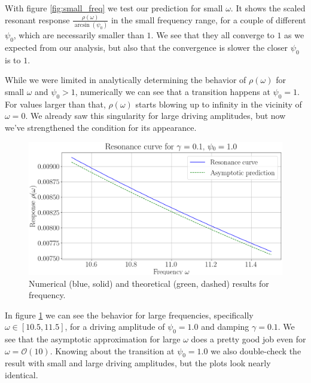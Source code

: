 \documentclass[10pt,a4paper,twocolumn]{article}
\begin{document}
With figure \ref{fig:small_freq} we test our prediction for small $\omega$. It shows the scaled resonant response $\frac{\rho(\omega)}{\arcsin(\psi_0)}$ in the small frequency range, for a couple of different $\psi_0$, which are necessarily smaller than $1$. We see that they all converge to $1$ as we expected from our analysis, but also that the convergence is slower the closer $\psi_0$ is to $1$.

While we were limited in analytically determining the behavior of $\rho(\omega)$ for small $\omega$ and $\psi_0 > 1$, numerically we can see that a transition happens at $\psi_0 = 1$. For values larger than that, $\rho(\omega)$ starts blowing up to infinity in the vicinity of $\omega = 0$. We already saw this singularity for large driving amplitudes, but now we've strengthened the condition for its appearance.

\begin{figure}[h]
\centering
\captionsetup{justification=centering}
\includegraphics[scale=0.25]{large_freq.png}
\caption{Numerical (blue, solid) and theoretical (green, dashed) results for frequency.}
\label{fig:large_freq}
\end{figure}

In figure \ref{fig:large_freq} we can see the behavior for large frequencies, specifically $\omega \in [10.5, 11.5]$, for a driving amplitude of $\psi_0 = 1.0$ and damping $\gamma = 0.1$. We see that the asymptotic approximation for large $\omega$ does a pretty good job even for $\omega = \mathcal{O}(10)$. Knowing about the transition at $\psi_0 = 1.0$ we also double-check the result with small and large driving amplitudes, but the plots look nearly identical.
\end{document}
